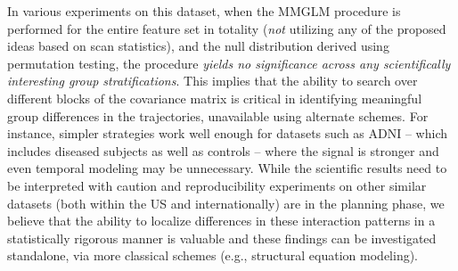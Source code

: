 In various experiments on this dataset, when the MMGLM procedure is performed for the entire feature set in totality ({\em not} 
utilizing any of the proposed ideas based on scan statistics), 
and the null distribution derived using permutation testing, the procedure {\em yields no significance across \textit{any} 
scientifically interesting group stratifications}. 
This implies that the ability to search over different blocks of the covariance matrix is critical in identifying meaningful group differences 
in the trajectories, unavailable 
using alternate schemes. For instance, simpler strategies work well enough for datasets such as ADNI -- 
  which includes diseased subjects as well as controls -- 
  where the signal is stronger and even temporal modeling may be unnecessary.
  While the scientific results need to be interpreted with caution and reproducibility experiments on 
other similar datasets (both within the US and internationally) are in the planning phase, 
we believe that the ability to localize 
differences in these interaction patterns in a statistically rigorous manner is valuable and these findings can be investigated standalone, via 
more classical schemes (e.g., structural equation modeling). 


